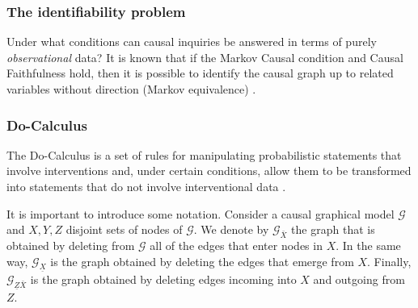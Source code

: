 \documentclass[review]{elsarticle}
\begin{document}
\subsubsection{The identifiability problem}
Under what conditions can causal inquiries be answered in terms of purely \textit{observational} data? It is known that if the Markov Causal condition and Causal Faithfulness hold, then it is possible to identify the causal graph up to related variables without direction (Markov equivalence) \citep{peters2012identifiability,mooij2016distinguishing}.

\subsubsection{Do-Calculus}
The Do-Calculus is a set of rules for manipulating probabilistic statements that involve interventions and, under certain conditions, allow them to be transformed into statements that do not involve interventional data \citep{pearl1995causal,pearl2009causality}. 
	
It is important to introduce some notation. Consider a causal graphical model $\mathcal{G}$ and $X,Y,Z$ disjoint sets of nodes of $\mathcal{G}$. We denote by $\mathcal{G}_{\bar{X}}$ the graph that is obtained by deleting from $\mathcal{G}$ all of the edges that enter nodes in $X$. In the same way, $\mathcal{G}_{\underline{X}}$ is the graph obtained by deleting the edges that emerge from $X$. Finally, $\mathcal{G}_{\underline{Z}\bar{X}}$ is the graph obtained by deleting edges incoming into $X$ and outgoing from $Z$.
	
\end{document}
